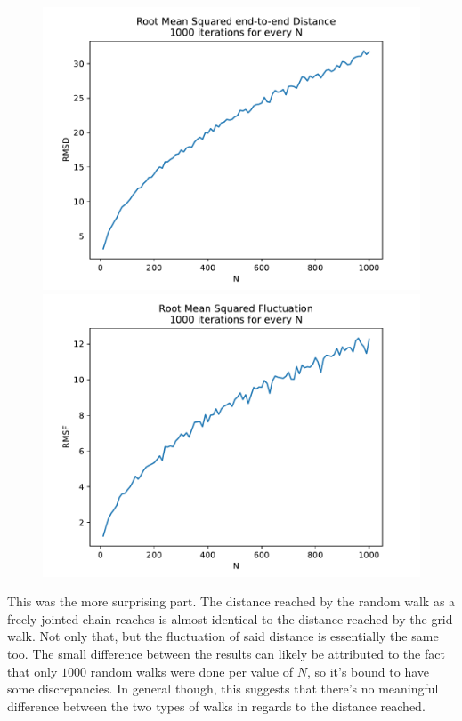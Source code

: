 \documentclass[a4paper,12pt]{article}
\begin{document}
\begin{figure}[!ht]
  \centering
  \begin{minipage}{0.49\textwidth}
    \includegraphics[width=\textwidth]{img/2-chain-rmsd.pdf}
  \end{minipage}
  \begin{minipage}{0.49\textwidth}
    \includegraphics[width=\textwidth]{img/2-chain-rmsf.pdf}
  \end{minipage}
\end{figure}

\FloatBarrier

This was the more surprising part. The distance reached by the random walk as a freely jointed chain reaches is
almost identical to the distance reached by the grid walk. Not only that, but the fluctuation of said distance is
essentially the same too. The small difference between the results can likely be attributed to the fact that only
$1000$ random walks were done per value of $N$, so it's bound to have some discrepancies. In general though, this
suggests that there's no meaningful difference between the two types of walks in regards to the distance reached.
\end{document}

